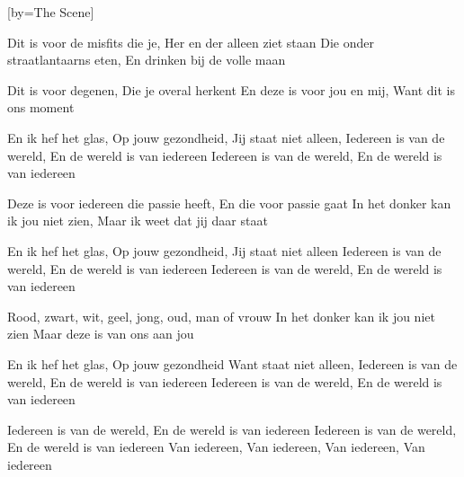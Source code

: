 

[by=The Scene]


\beginverse
Dit is voor de misfits die je, Her en der alleen ziet staan
Die onder straatlantaarns eten, En drinken bij de volle maan
\endverse

\beginverse
Dit is voor degenen, Die je overal herkent
En deze is voor jou en mij, Want dit is ons moment
\endverse

\beginchorus
En ik hef het glas, Op jouw gezondheid, Jij staat niet alleen,
Iedereen is van de wereld, En de wereld is van iedereen
Iedereen is van de wereld, En de wereld is van iedereen
\endchorus

\beginverse
Deze is voor iedereen die passie heeft, En die voor passie gaat
In het donker kan ik jou niet zien, Maar ik weet dat jij daar staat
\endverse

\beginchorus
En ik hef het glas, Op jouw gezondheid, Jij staat niet alleen
Iedereen is van de wereld, En de wereld is van iedereen
Iedereen is van de wereld, En de wereld is van iedereen
\endchorus

\beginverse
Rood, zwart, wit, geel, jong, oud, man of vrouw
In het donker kan ik jou niet zien
Maar deze is van ons aan jou
\endverse

\beginchorus
En ik hef het glas, Op jouw gezondheid
Want staat niet alleen,
Iedereen is van de wereld, En de wereld is van iedereen
Iedereen is van de wereld, En de wereld is van iedereen

Iedereen is van de wereld, En de wereld is van iedereen
Iedereen is van de wereld, En de wereld is van iedereen
Van iedereen, Van iedereen, Van iedereen, Van iedereen
\endchorus



\chordson
\endsong
